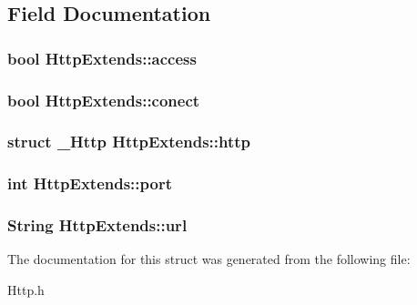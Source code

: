 \subsection{Field Documentation}
\subsubsection[{access}]{\setlength{\rightskip}{0pt plus 5cm}bool Http\-Extends\-::access}\label{structHttpExtends_afbd8700afd5bb3eb484255dc14e83812}
\subsubsection[{conect}]{\setlength{\rightskip}{0pt plus 5cm}bool Http\-Extends\-::conect}\label{structHttpExtends_ae6c4a0fd15e6df1eaa00d21d5a196d78}
\subsubsection[{http}]{\setlength{\rightskip}{0pt plus 5cm}struct {\bf \-\_\-\-Http} Http\-Extends\-::http}\label{structHttpExtends_a81ed6e5d7c729ff3268024a1c2c2df8a}
\subsubsection[{port}]{\setlength{\rightskip}{0pt plus 5cm}int Http\-Extends\-::port}\label{structHttpExtends_ad2748bfb9d2a6b28a966d9c6af698a59}
\subsubsection[{url}]{\setlength{\rightskip}{0pt plus 5cm}String Http\-Extends\-::url}\label{structHttpExtends_a1588ec92036f65666c42379bc9e3d79b}


The documentation for this struct was generated from the following file\-:\begin{DoxyCompactItemize}
\item 
Http.\-h\end{DoxyCompactItemize}
